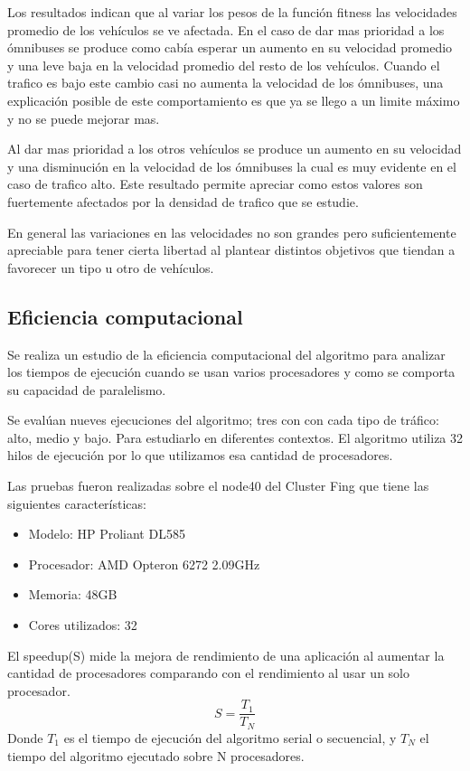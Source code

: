 Los resultados indican que al variar los pesos de la función fitness las velocidades promedio de los vehículos se ve afectada. En el caso de dar mas prioridad a los ómnibuses se produce como cabía esperar un aumento en su velocidad promedio y una leve baja en la velocidad promedio del resto de los vehículos. Cuando el trafico es bajo este cambio casi no aumenta la velocidad de los ómnibuses, una explicación posible de este comportamiento es que ya se llego a un limite máximo y no se puede mejorar mas.

Al dar mas prioridad a los otros vehículos se produce un aumento en su velocidad y una disminución en la velocidad de los ómnibuses la cual es muy evidente en el caso de trafico alto. Este resultado permite apreciar como estos valores son fuertemente afectados por la densidad de trafico que se estudie.

En general las variaciones en las velocidades no son grandes pero suficientemente apreciable para tener cierta libertad al plantear distintos objetivos que tiendan a favorecer un tipo u otro de vehículos.


\subsection{Eficiencia computacional}

Se realiza un estudio de la eficiencia computacional del algoritmo para analizar los tiempos de ejecución cuando se usan varios procesadores y como se comporta su capacidad de paralelismo.

Se evalúan nueves ejecuciones del algoritmo; tres con con cada tipo de tráfico: alto, medio y bajo. Para estudiarlo en diferentes contextos. El algoritmo utiliza 32 hilos de ejecución por lo que utilizamos esa cantidad de procesadores.

Las pruebas fueron realizadas sobre el node40 del Cluster Fing que tiene las siguientes características:

\begin{itemize}
	\item Modelo: HP Proliant DL585
	\item Procesador: AMD Opteron 6272 2.09GHz
	\item Memoria: 48GB
	\item Cores utilizados: 32
\end{itemize}





El speedup(S) mide la mejora de rendimiento de una aplicación al aumentar la cantidad de procesadores comparando con el rendimiento al usar un solo procesador.
\begin{equation}
\label{eq:funcion_speedup}
S = \frac{T_1}{T_N}
\end{equation}
Donde ${T_1}$ es el tiempo de ejecución del algoritmo serial o secuencial, y ${T_N}$ el tiempo del algoritmo ejecutado sobre N procesadores.
\newline

